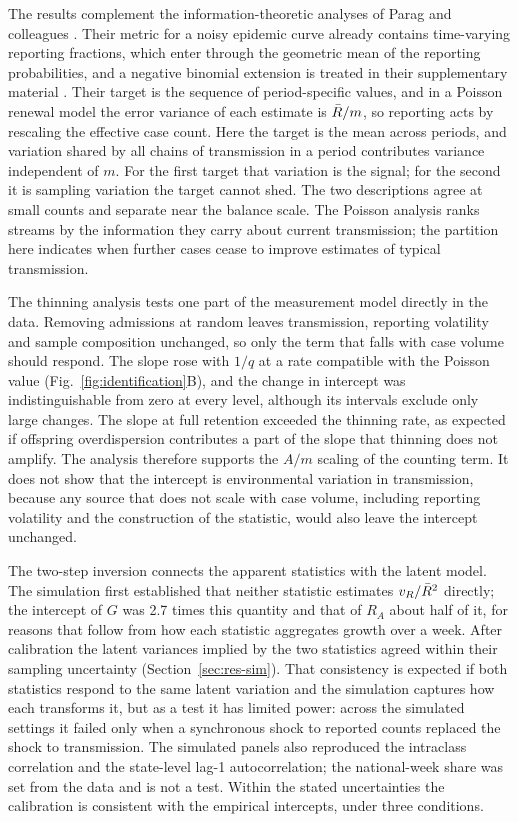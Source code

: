 The results complement the information-theoretic analyses of Parag and colleagues \citep{parag2021improved, parag2022quantifying}. Their metric for a noisy epidemic curve already contains time-varying reporting fractions, which enter through the geometric mean of the reporting probabilities, and a negative binomial extension is treated in their supplementary material \citep{parag2022quantifying}. Their target is the sequence of period-specific values, and in a Poisson renewal model the error variance of each estimate is $\bar{R}/m$, so reporting acts by rescaling the effective case count. Here the target is the mean across periods, and variation shared by all chains of transmission in a period contributes variance independent of $m$. For the first target that variation is the signal; for the second it is sampling variation the target cannot shed. The two descriptions agree at small counts and separate near the balance scale. The Poisson analysis ranks streams by the information they carry about current transmission; the partition here indicates when further cases cease to improve estimates of typical transmission.

The thinning analysis tests one part of the measurement model directly in the data. Removing admissions at random leaves transmission, reporting volatility and sample composition unchanged, so only the term that falls with case volume should respond. The slope rose with $1/q$ at a rate compatible with the Poisson value (Fig.~\ref{fig:identification}B), and the change in intercept was indistinguishable from zero at every level, although its intervals exclude only large changes. The slope at full retention exceeded the thinning rate, as expected if offspring overdispersion contributes a part of the slope that thinning does not amplify. The analysis therefore supports the $A/m$ scaling of the counting term. It does not show that the intercept is environmental variation in transmission, because any source that does not scale with case volume, including reporting volatility and the construction of the statistic, would also leave the intercept unchanged.

The two-step inversion connects the apparent statistics with the latent model. The simulation first established that neither statistic estimates $v_R/\bar{R}^2$ directly; the intercept of $G$ was 2.7 times this quantity and that of $R_A$ about half of it, for reasons that follow from how each statistic aggregates growth over a week. After calibration the latent variances implied by the two statistics agreed within their sampling uncertainty (Section~\ref{sec:res-sim}). That consistency is expected if both statistics respond to the same latent variation and the simulation captures how each transforms it, but as a test it has limited power: across the simulated settings it failed only when a synchronous shock to reported counts replaced the shock to transmission. The simulated panels also reproduced the intraclass correlation and the state-level lag-1 autocorrelation; the national-week share was set from the data and is not a test. Within the stated uncertainties the calibration is consistent with the empirical intercepts, under three conditions.


